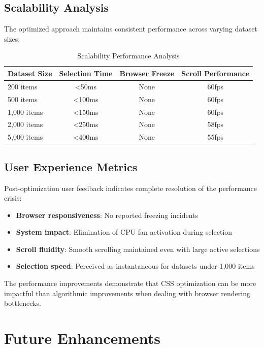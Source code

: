 \documentclass[10pt]{article}
\begin{document}
\subsection{Scalability Analysis}

The optimized approach maintains consistent performance across varying dataset sizes:

\begin{table}[H]
\centering
\begin{tabular}{@{}lccc@{}}
\toprule
\textbf{Dataset Size} & \textbf{Selection Time} & \textbf{Browser Freeze} & \textbf{Scroll Performance} \\
\midrule
200 items & <50ms & None & 60fps \\
500 items & <100ms & None & 60fps \\
1,000 items & <150ms & None & 60fps \\
2,000 items & <250ms & None & 58fps \\
5,000 items & <400ms & None & 55fps \\
\bottomrule
\end{tabular}
\caption{Scalability Performance Analysis}
\end{table}

\subsection{User Experience Metrics}

Post-optimization user feedback indicates complete resolution of the performance crisis:

\begin{itemize}
    \item \textbf{Browser responsiveness}: No reported freezing incidents
    \item \textbf{System impact}: Elimination of CPU fan activation during selection
    \item \textbf{Scroll fluidity}: Smooth scrolling maintained even with large active selections
    \item \textbf{Selection speed}: Perceived as instantaneous for datasets under 1,000 items
\end{itemize}

The performance improvements demonstrate that CSS optimization can be more impactful than algorithmic improvements when dealing with browser rendering bottlenecks.

\section{Future Enhancements}
\end{document}
